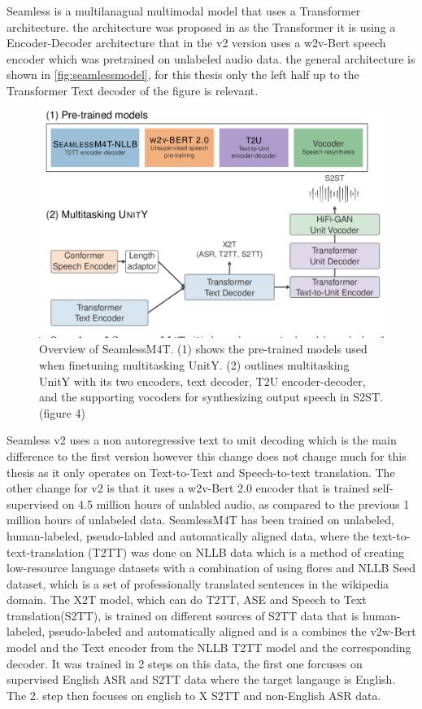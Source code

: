 Seamless is a multilanagual multimodal model that uses a Transformer architecture. 
the architecture was proposed in \cite{seamless2023}
as the Transformer it is using a Encoder-Decoder architecture that in the v2 version uses a w2v-Bert speech encoder which was pretrained on unlabeled audio data. 
the general architecture is shown in \autoref{fig:seamlessmodel}, for this thesis only the left half up to the Transformer Text decoder of the figure is relevant. 

\begin{figure}
        \centering%
        \includegraphics[width=0.5\linewidth]{Latex//sections/images/seamlessmodel.png}
        \caption{Overview of SeamlessM4T. (1) shows the pre-trained models used when finetuning multitasking UnitY. (2) outlines multitasking UnitY with its two encoders, text decoder, T2U encoder-decoder, and the supporting vocoders for synthesizing output speech in S2ST. \cite{seamless2023}(figure 4)}
        \label{fig:seamlessmodel}
\end{figure}
    
Seamless v2 uses a non autoregressive text to unit decoding which is the main difference to the first version however this change does not change much for this thesis as it only operates on Text-to-Text and Speech-to-text translation. 
The other change for v2 is that it uses a w2v-Bert 2.0 \cite{chung2021w2vbertcombiningcontrastivelearning} encoder that is trained self-supervised on 4.5 million hours of unlabled audio, as compared to the previous 1 million hours of unlabeled data. 
SeamlessM4T has been trained on unlabeled, human-labeled, pseudo-labled and automatically aligned data, where the text-to-text-translation (T2TT) was done on NLLB data \cite{nllbteam2022languageleftbehindscaling}
which is a method of creating low-resource language datasets with a combination of using flores \cite{guzmán2019floresevaluationdatasetslowresource} and NLLB Seed dataset, which is a set of professionally translated sentences in the wikipedia domain. 
The X2T model, which can do T2TT, ASE and Speech to Text translation(S2TT), is trained on different sources of S2TT data that is human-labeled, pseudo-labeled and automatically aligned and is a combines the v2w-Bert model and the Text encoder from the NLLB T2TT model and the corresponding decoder.
It was trained in 2 steps on this data, the first one forcuses on supervised English ASR and S2TT data where the target langauge is English. 
The 2. step then focuses on english to X S2TT and non-English ASR data.


